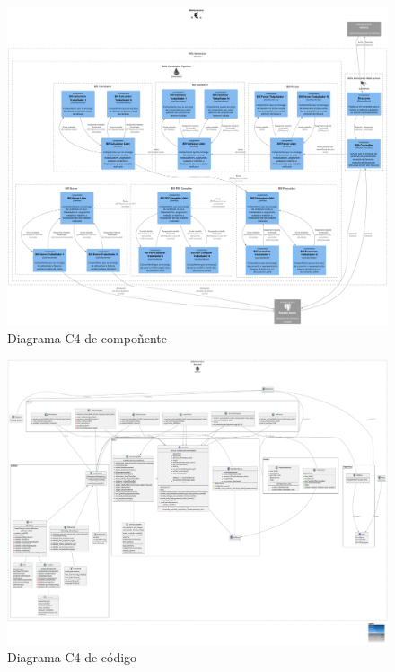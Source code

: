 \documentclass[galician]{article}
\begin{document}
\begin{figure}[ht!]
	\centering
	\includegraphics[width=1.0\textwidth]{bills_generator_component.pdf}
	\caption{Diagrama C4 de compoñente}
	\label{fig:component}
\end{figure}

\begin{figure}[ht!]
	\centering
	\includegraphics[width=1.0\textwidth]{bills_generator_code.pdf}
	\caption{Diagrama C4 de código}
	\label{fig:code}
\end{figure}
\end{document}
